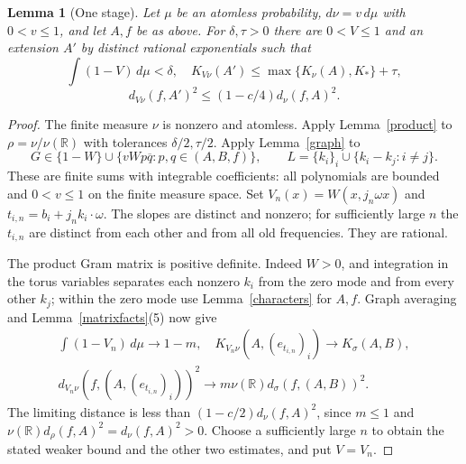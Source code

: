 \documentclass[reqno,a4paper,12pt]{amsart}
\newtheorem{lemma}[theorem]{Lemma}
\newcommand{\R}{\mathbb R}
\begin{document}
\begin{lemma}[One stage]\label{stage}
Let $\mu$ be an atomless probability, $d\nu=v\,d\mu$ with $0<v\le1$,
and let $A,f$ be as above. For $\delta,\tau>0$ there are $0<V\le1$
and an extension $A'$ by distinct rational exponentials such that
\[
 \int(1-V)\,d\mu<\delta,\quad
 K_{V\nu}(A')\le\max\{K_\nu(A),K_*\}+\tau,
\]
\[
 d_{V\nu}(f,A')^2\le(1-c/4)d_\nu(f,A)^2.
\]
\end{lemma}
\begin{proof}
The finite measure $\nu$ is nonzero and atomless. Apply
Lemma~\ref{product} to $\rho=\nu/\nu(\R)$ with tolerances
$\delta/2,\tau/2$. Apply Lemma~\ref{graph} to
\[
 G\in\{1-W\}\cup\{vW p\overline q:p,q\in(A,B,f)\},\qquad
 L=\{k_i\}_i\cup\{k_i-k_j:i\ne j\}.
\]
These are finite sums with integrable coefficients: all polynomials
are bounded and $0<v\le1$ on the finite measure space.
Set $V_n(x)=W(x,j_n\omega x)$ and
$t_{i,n}=b_i+j_n k_i\cdot\omega$. The slopes are distinct and nonzero;
for sufficiently large $n$ the $t_{i,n}$ are distinct from each other
and from all old frequencies. They are rational.

The product Gram matrix is positive definite. Indeed $W>0$, and
integration in the torus variables separates each nonzero $k_i$ from
the zero mode and from every other $k_j$; within the zero mode use
Lemma~\ref{characters} for $A,f$.
Graph averaging and Lemma~\ref{matrixfacts}(5) now give
\begin{gather*}
 \int(1-V_n)\,d\mu\to1-m,\quad
 K_{V_n\nu}(A,(e_{t_{i,n}})_i)\to K_\sigma(A,B),\\
 d_{V_n\nu}(f,(A,(e_{t_{i,n}})_i))^2
 \to m\nu(\R)d_\sigma(f,(A,B))^2.
\end{gather*}
The limiting distance is less than
$(1-c/2)d_\nu(f,A)^2$, since $m\le1$ and
$\nu(\R)d_\rho(f,A)^2=d_\nu(f,A)^2>0$.
Choose a sufficiently large $n$ to obtain the stated weaker bound
and the other two estimates, and put $V=V_n$.
\end{proof}
\end{document}
